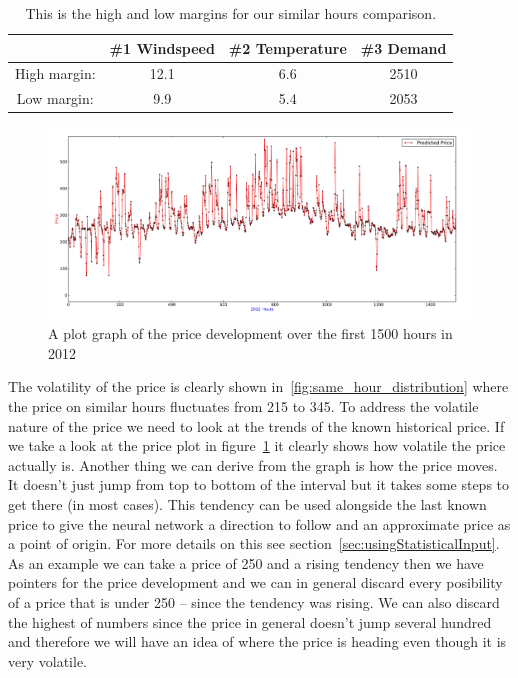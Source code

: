 \begin{table}[H]
\centering  %
\begin{tabular}{c c c c} %
 & \#1 Windspeed & \#2 Temperature & \#3 Demand \\ [0.5ex] %
\hline                  %
High margin: & 12.1 & 6.6 & 2510  \\
Low margin: & 9.9 & 5.4 & 2053 \\ [1ex] %
\hline %
\end{tabular}
\caption{This is the high and low margins for our similar hours comparison.} %
\label{table:similarHoursLimits} %
\end{table}

\begin{figure}[H]
\centering
\includegraphics[width=\textwidth ,natwidth=410,natheight=237]{billeder/energy_price_plots/plotGraph.jpg}
\caption{A plot graph of the price development over the first 1500 hours in 2012}
\label{fig:plotGraph}
\end{figure}

The volatility of the price is clearly shown in~\ref{fig:same_hour_distribution} where the price on similar hours fluctuates from 215 to 345. To address the volatile nature of the price we need to look at the trends of the known historical price. If we take a look at the price plot in figure~\ref{fig:plotGraph} it clearly shows how volatile the price actually is. Another thing we can derive from the graph is how the price moves. It doesn't just jump from top to bottom of the interval but it takes some steps to get there (in most cases). This tendency can be used alongside the last known price to give the neural network a direction to follow and an approximate price as a point of origin. For more details on this see section~\ref{sec:usingStatisticalInput}. As an example we can take a price of 250 and a rising tendency then we have pointers for the price development and we can in general discard every posibility of a price that is under 250 -- since the tendency was rising. We can also discard the highest of numbers since the price in general doesn't jump several hundred and therefore we will have an idea of where the price is heading even though it is very volatile.


